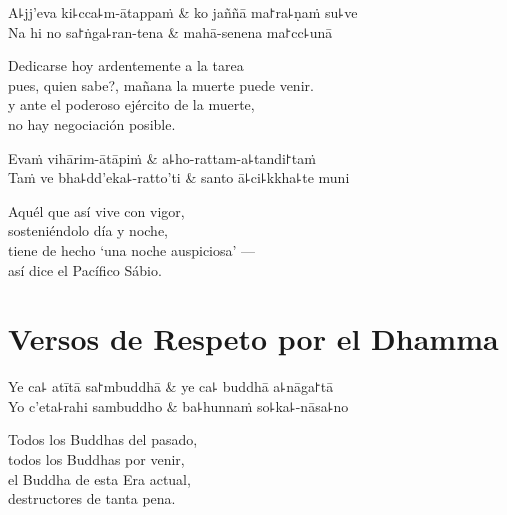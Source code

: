 \begin{twochants}
  A꜕jj'eva ki꜕cca꜕m-ātappaṁ & ko jaññā ma꜓ra꜕ṇaṁ su꜕ve \\
  Na hi no sa꜓ṅga꜕ran-tena & mahā-senena ma꜓cc꜕unā \\
\end{twochants}

\begin{english}
  Dedicarse hoy ardentemente a la tarea\\
  pues, quien sabe?, mañana la muerte puede venir.\\
  y ante el poderoso ejército de la muerte,\\
  no hay negociación posible.
\end{english}

\clearpage

\begin{twochants}
  Evaṁ vihārim-ātāpiṁ & a꜕ho-rattam-a꜕tandi꜓taṁ \\
  Taṁ ve bha꜕dd'eka꜕-ratto'ti & santo ā꜕ci꜕kkha꜕te muni \\
\end{twochants}

\begin{english}
  Aquél que así vive con vigor,\\
  sosteniéndolo día y noche,\\
  tiene de hecho `una noche auspiciosa' ---\\
  así dice el Pacífico Sábio.
\end{english}

\chapter{Versos de Respeto por el Dhamma}


\begin{leader}
\end{leader}

\begin{twochants}
  Ye ca꜕ atītā sa꜓mbuddhā & ye ca꜕ buddhā a꜕nāga꜓tā \\
  Yo c'eta꜕rahi sambuddho & ba꜕hunnaṁ so꜕ka꜕-nāsa꜕no \\
\end{twochants}

\begin{english}
  Todos los Buddhas del pasado,\\
  todos los Buddhas por venir,\\
  el Buddha de esta Era actual,\\
  destructores de tanta pena.
\end{english}

